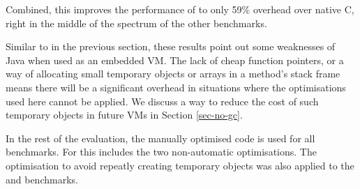 Combined, this improves the performance of  to only 59\% overhead over native C, right in the middle of the spectrum of the other benchmarks.

Similar to  in the previous section, these results point out some weaknesses of Java when used as an embedded VM. The lack of cheap function pointers, or a way of allocating small temporary objects or arrays in a method's stack frame means there will be a significant overhead in situations where the optimisations used here cannot be applied. We discuss a way to reduce the cost of such temporary objects in future VMs in Section \ref{sec-no-gc}.

In the rest of the evaluation, the manually optimised code is used for all benchmarks. For  this includes the two non-automatic optimisations. The optimisation to avoid repeatly creating temporary objects was also applied to the  and  benchmarks.
